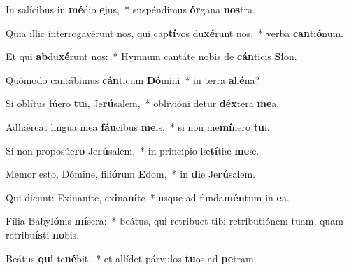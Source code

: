 \item In salícibus in \textbf{mé}dio \textbf{e}jus,~* suspéndimus \textbf{ór}gana \textbf{nos}tra.
\item Quia illic interrogavérunt nos, qui cap\textbf{tí}vos du\textbf{xé}runt nos,~* verba \textbf{can}ti\textbf{ó}num.
\item Et qui \textbf{ab}du\textbf{xé}runt nos:~* Hymnum cantáte nobis de \textbf{cán}ticis \textbf{Si}on.
\item Quómodo cantábimus \textbf{cán}ticum \textbf{Dó}mini~* in terra \textbf{a}li\textbf{é}na?
\item Si oblítus fúero \textbf{tu}i, Je\textbf{rú}salem,~* oblivióni detur \textbf{déx}tera \textbf{me}a.
\item Adhǽreat lingua mea \textbf{fáu}cibus \textbf{me}is,~* si non me\textbf{mí}nero \textbf{tu}i.
\item Si non proposúe\textbf{ro} Je\textbf{rú}salem,~* in princípio læ\textbf{tí}tiæ \textbf{me}æ.
\item Memor esto, Dómine, fili\textbf{ó}rum \textbf{E}dom,~* in \textbf{di}e Je\textbf{rú}salem.
\item Qui dicunt: Exinaníte, ex\textbf{i}na\textbf{ní}te~* usque ad funda\textbf{mén}tum in \textbf{e}a.
\item Fília Baby\textbf{ló}nis \textbf{mí}sera:~* beátus, qui retríbuet tibi retributiónem tuam, quam retribu\textbf{ís}ti \textbf{no}bis.
\item Beátus \textbf{qui} te\textbf{né}bit,~* et allídet párvulos \textbf{tu}os ad \textbf{pe}tram.
